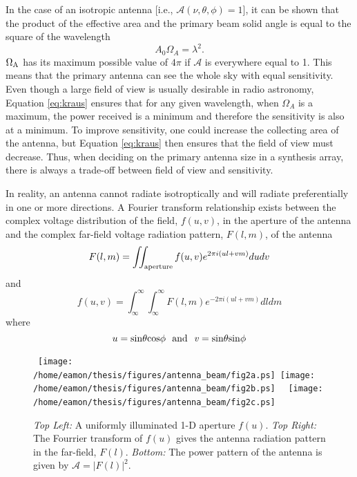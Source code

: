 In the case of an isotropic antenna [i.e., $\mathcal{A}(\nu,\theta,\phi)=1$], it can be shown that the product of the effective area and the primary beam solid angle is equal to the square of the wavelength \citep{kraus_1986}
\begin{equation}
A_{0}\Omega _{A} = \lambda ^2.
\label{eq:kraus}
\end{equation}
$\Omega _{\rm{A}}$ has its maximum possible value of $4\pi$ if $\mathcal{A}$ is everywhere equal to 1. This means that the primary antenna can see the whole sky with equal sensitivity. Even though a large field of view is usually desirable in radio astronomy, Equation \ref{eq:kraus} ensures that for any given wavelength, when $\Omega _{A}$ is a maximum, the power received is a minimum and therefore the sensitivity is also at a minimum. To improve sensitivity, one could increase the collecting area of the antenna, but Equation \ref{eq:kraus} then ensures that the field of view must decrease. Thus, when deciding on the primary antenna size in a synthesis array, there is always a trade-off between field of view and sensitivity. 

In reality, an antenna cannot radiate isotroptically and will radiate preferentially in one or more directions. A Fourier transform relationship exists between the complex voltage distribution of the field, $f(u,v)$, in the aperture of the antenna and the complex far-field voltage radiation pattern, $F(l,m)$, of the antenna \citep{kraus_1986}
\begin{equation}
F(l,m)=\int\!\!\! \int _{\rm{aperture}} f(u,v)e^{2\pi i(ul+vm)}dudv
\end{equation}
and
\begin{equation}
f(u,v)=\int ^{\infty} _{\infty}\int ^{\infty} _{\infty} F(l,m)e^{-2\pi i(ul+vm)}dldm
\label{eq:illum1}
\end{equation}
where
\begin{equation}
u=\rm{sin}\theta \rm{cos}\phi \ \  \rm{and} \ \ \mathit{v}=\rm{sin}\theta \rm{sin}\phi
\label{eq:illum2}
\end{equation}

\begin{figure}[hbt!]
\centering 
\mbox{
          \texttt{[image: /home/eamon/thesis/figures/antenna\_beam/fig2a.ps]}
          \texttt{[image: /home/eamon/thesis/figures/antenna\_beam/fig2b.ps]}
          }
\mbox{
          \texttt{[image: /home/eamon/thesis/figures/antenna\_beam/fig2c.ps]}
          }
\caption[Radiation and power pattern of a uniformly illuminated antenna.]{\textit{Top Left:} A uniformly illuminated 1-D aperture $f(u)$. \textit{Top Right:} The Fourrier transform of $f(u)$ gives the antenna radiation pattern in the far-field, $F(l)$. \textit{Bottom:} The power pattern of the antenna is given by $\mathcal{A}=|F(l)|^2$.}
\label{fig2a}
\end{figure}

